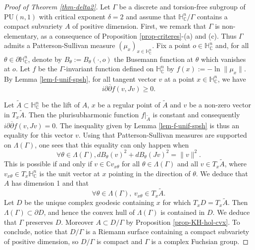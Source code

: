 \documentclass{article}
\theoremstyle{definition}
\theoremstyle{remark}
\newcommand{\C}{\mathbb{C}}
\newcommand{\HNC}{\mathbb{H}^{n}_{\C}}
\newcommand{\PHNC}{\partial\mathbb{H}^{n}_{\C}}
\newcommand{\PU}{\mathrm{PU}}
\begin{document}
	\begin{proof}[Proof of Theorem \ref{thm-delta2}]
	Let $\Gamma$ be a discrete and torsion-free subgroup of $\PU(n,1)$ with critical exponent $\delta=2$ and assume that $\HNC/\Gamma$ contains a compact subvariety $A$ of positive dimension. 
	First, we remark that $\Gamma$ is non-elementary, as a consequence of Proposition \ref{prop-criteres}-(a) and (c). Thus $\Gamma$ admits a Patterson-Sullivan measure $(\mu_x)_{x\in \HNC}$. Fix a point $o\in \HNC$ and, for all $\theta\in \PHNC$, denote by $B_\theta:=B_{\theta}(\cdot,o)$ the Busemann function at $\theta$ which vanishes at $o$. Let ${f}$ be the $\Gamma$-invariant function defined on $\HNC$ by $f(x):=-\ln \lVert \mu_x\rVert$. By Lemma \ref{lem-f-unif-spsh}, for all tangent vector $v$ at a point $x\in \HNC$, we have
	\begin{equation*}
		i\partial\overline{\partial}{f}(v,Jv) \ge 0.
	\end{equation*}
		
	Let $\widetilde{A}\subset \HNC$ be the lift of $A$, $x$ be a regular point of $\widetilde{A}$ and $v$ be a non-zero vector in $T_x\widetilde{A}$. Then the plurisubharmonic function ${f}\vert_{ \widetilde{A}}$ is constant and consequently $i\partial\overline{\partial}{f}(v,Jv) = 0$.
	The inequality given by Lemma \ref{lem-f-unif-spsh} is thus an equality for this vector $v$. Using that Patterson-Sullivan measures are supported on $\Lambda(\Gamma)$, one sees that this equality can only happen when\begin{equation*}
		\forall \theta\in \Lambda(\Gamma), dB_{\theta}(v)^{2}+dB_{\theta}(Jv)^{2} = \lVert v\rVert^{2}.
	\end{equation*}
	This is possible if and only if $v\in \C v_{x\theta}$ for all $\theta\in \Lambda(\Gamma)$ and all $v\in T_x\widetilde{A}$, where $v_{x\theta} \in T_x\HNC$ is the unit vector at $x$ pointing in the direction of $\theta$. We deduce that $A$ has dimension 1 and that
	\begin{equation*}
		\forall \theta\in \Lambda(\Gamma),\ v_{x\theta}\in T_x\widetilde{A}.
	\end{equation*}
	Let $D$ be the unique complex geodesic containing $x$ for which $T_xD=T_x\widetilde{A}$. Then $\Lambda(\Gamma)\subset \partial D$, and hence the convex hull of $\Lambda(\Gamma)$ is contained in $D$. We deduce that $\Gamma$ preserves $D$. Moreover $A\subset D/\Gamma$ by Proposition \ref{prop-KH-hol-cvx}. To conclude, notice that $D/\Gamma$ is a Riemann surface containing a compact subvariety of positive dimension, so $D/\Gamma$ is compact and $\Gamma$ is a complex Fuchsian group. 
\end{proof}
\end{document}
